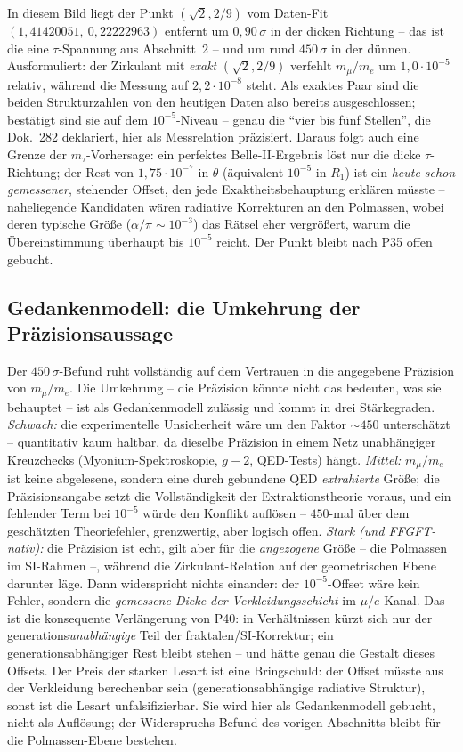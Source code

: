 In diesem Bild liegt der Punkt $(\sqrt2, 2/9)$ vom Daten-Fit
$(1{,}41420051,\ 0{,}22222963)$ entfernt um $0{,}90\,\sigma$ in der
dicken Richtung -- das ist die eine $\tau$-Spannung aus
Abschnitt~2 -- und um rund $450\,\sigma$ in der dünnen. Ausformuliert:
der Zirkulant mit \emph{exakt} $(\sqrt2, 2/9)$ verfehlt $m_\mu/m_e$ um
$1{,}0\cdot10^{-5}$ relativ, während die Messung auf $2{,}2\cdot10^{-8}$
steht. Als exaktes Paar sind die beiden Strukturzahlen von den heutigen
Daten also bereits ausgeschlossen; bestätigt sind sie auf dem
$10^{-5}$-Niveau -- genau die \enquote{vier bis fünf Stellen}, die
Dok.~282 deklariert, hier als Messrelation präzisiert. Daraus folgt auch
eine Grenze der $m_\tau$-Vorhersage: ein perfektes Belle-II-Ergebnis löst
nur die dicke $\tau$-Richtung; der Rest von $1{,}75\cdot10^{-7}$ in
$\theta$ (äquivalent $10^{-5}$ in $R_1$) ist ein \emph{heute schon
gemessener}, stehender Offset, den jede Exaktheitsbehauptung erklären
müsste -- naheliegende Kandidaten wären radiative Korrekturen an den
Polmassen, wobei deren typische Größe ($\alpha/\pi \sim 10^{-3}$) das
Rätsel eher vergrößert, warum die Übereinstimmung überhaupt bis
$10^{-5}$ reicht. Der Punkt bleibt nach P35 offen gebucht.

\subsection{Gedankenmodell: die Umkehrung der Präzisionsaussage}
Der $450\,\sigma$-Befund ruht vollständig auf dem Vertrauen in die
angegebene Präzision von $m_\mu/m_e$. Die Umkehrung -- die Präzision
könnte nicht das bedeuten, was sie behauptet -- ist als Gedankenmodell
zulässig und kommt in drei Stärkegraden. \emph{Schwach:} die
experimentelle Unsicherheit wäre um den Faktor $\sim450$ unterschätzt --
quantitativ kaum haltbar, da dieselbe Präzision in einem Netz unabhängiger
Kreuzchecks (Myonium-Spektroskopie, $g\!-\!2$, QED-Tests) hängt.
\emph{Mittel:} $m_\mu/m_e$ ist keine abgelesene, sondern eine durch
gebundene QED \emph{extrahierte} Größe; die Präzisionsangabe setzt die
Vollständigkeit der Extraktionstheorie voraus, und ein fehlender Term bei
$10^{-5}$ würde den Konflikt auflösen -- $450$-mal über dem geschätzten
Theoriefehler, grenzwertig, aber logisch offen. \emph{Stark (und
FFGFT-nativ):} die Präzision ist echt, gilt aber für die \emph{angezogene}
Größe -- die Polmassen im SI-Rahmen --, während die Zirkulant-Relation auf
der geometrischen Ebene darunter läge. Dann widerspricht nichts einander:
der $10^{-5}$-Offset wäre kein Fehler, sondern die \emph{gemessene Dicke
der Verkleidungsschicht} im $\mu/e$-Kanal. Das ist die konsequente
Verlängerung von P40: in Verhältnissen kürzt sich nur der
generations\emph{unabhängige} Teil der fraktalen/SI-Korrektur; ein
generationsabhängiger Rest bleibt stehen -- und hätte genau die Gestalt
dieses Offsets. Der Preis der starken Lesart ist eine Bringschuld: der
Offset müsste aus der Verkleidung berechenbar sein (generationsabhängige
radiative Struktur), sonst ist die Lesart unfalsifizierbar. Sie wird hier
als Gedankenmodell gebucht, nicht als Auflösung; der Widerspruchs-Befund
des vorigen Abschnitts bleibt für die Polmassen-Ebene bestehen.

